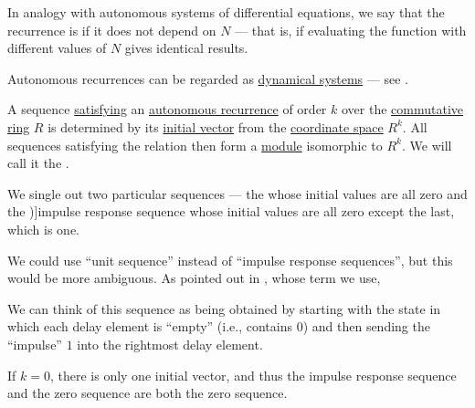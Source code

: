 \begin{definition}\label{def:autonomous_recurrence_relation}\mimprovised
  In analogy with autonomous systems of differential equations, we say that the recurrence is  if it does not depend on \( N \) --- that is, if evaluating the function with different values of \( N \) gives identical results.
\end{definition}
\begin{comments}
  \item Autonomous recurrences can be regarded as \hyperref[def:dynamical_system]{dynamical systems} --- see .
\end{comments}

\begin{definition}\label{def:recurrence_relation_space}\mimprovised
  A sequence \hyperref[def:recurrence_relation/sequence]{satisfying} an \hyperref[def:recurrence_relation]{autonomous recurrence} of order \( k \) over the \hyperref[def:ring/commutative]{commutative ring} \( R \) is determined by its \hyperref[def:recurrence_relation/state]{initial vector} from the \hyperref[def:sequence_space]{coordinate space} \( R^k \). All sequences satisfying the relation then form a \hyperref[def:module]{module} isomorphic to \( R^k \). We will call it the .

  We single out two particular sequences --- the  whose initial values are all zero and the \term[en=impulse response sequence (\cite[402]{LidlNiederreiter1997FiniteFields})]{impulse response sequence} whose initial values are all zero except the last, which is one.
\end{definition}
\begin{comments}
  \item We could use \enquote{unit sequence} instead of \enquote{impulse response sequences}, but this would be more ambiguous. As pointed out in , whose term we use,
  \begin{displayquote}
    We can think of this sequence as being obtained by starting with the state in which each delay element is \enquote{empty} (i.e., contains
\( 0 \)) and then sending the \enquote{impulse} \( 1 \) into the rightmost delay element.
  \end{displayquote}

  \item If \( k = 0 \), there is only one initial vector, and thus the impulse response sequence and the zero sequence are both the zero sequence.
\end{comments}

